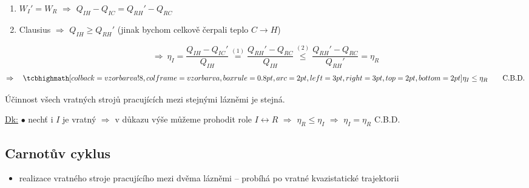 \begin{enumerate}[label=(\arabic*),nosep]
  \item $W_I' = W_R$ \quad $\Rightarrow$ \quad $Q_{IH} - Q_{IC} = Q_{RH}' - Q_{RC}$
  \item Clausius \quad $\Rightarrow$ \quad $Q_{IH} \geq Q_{RH}'$ \quad (jinak bychom celkově čerpali teplo $C\to H$)
\end{enumerate}
\[
  \Rightarrow\ \eta_I = \frac{Q_{IH} - Q_{IC}'}{Q_{IH}} \overset{(1)}{=} \frac{Q_{RH}' - Q_{RC}}{Q_{IH}}
  \overset{(2)}{\leq} \frac{Q_{RH}' - Q_{RC}}{Q_{RH}'} = \eta_R
\]
\[
  \Rightarrow\quad \vzorec{\eta_I \leq \eta_R} \qquad\text{C.B.D.}
\]

\begin{veta}[Důsledek]
Účinnost všech vratných strojů pracujících mezi stejnými lázněmi je stejná.
\end{veta}
\underline{Dk:} $\bullet$ nechť i $I$ je vratný $\Rightarrow$ v důkazu výše můžeme prohodit role $I\leftrightarrow R$
$\Rightarrow$ $\eta_R \leq \eta_I$ $\Rightarrow$ $\eta_I = \eta_R$ \hfill C.B.D.

\subsection*{Carnotův cyklus}
\begin{itemize}[nosep]
  \item realizace vratného stroje pracujícího mezi dvěma lázněmi -- probíhá po vratné kvazistatické trajektorii \\
\end{itemize}

